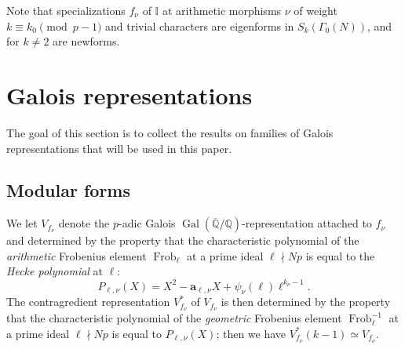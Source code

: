 \documentclass[a4paper,11pt]{amsart}
\numberwithin{equation}{section}
\theoremstyle{plain}
\theoremstyle{definition}
\theoremstyle{remark}
\newcommand{\Q}{\mathbb Q}
\newcommand{\I}{\mathbb{I}}
\DeclareMathOperator{\Frob}{Frob}
\DeclareMathOperator{\Gal}{Gal}
\begin{document}
Note that specializations $f_\nu$ of $\I$ at arithmetic morphisms $\nu$ of weight $k\equiv k_0\pmod{p-1}$ and trivial characters are eigenforms in $S_k(\Gamma_0(N))$, and for $k\neq 2$ are newforms. 


\section{Galois representations} 
The goal of this section is to collect the results on families of Galois representations that will be used in this paper. 

\subsection{Modular forms}
We let $V_{{f}_{\nu}}$ denote the $p$-adic Galois $\Gal(\overline{\Q}/\Q)$-representation attached to ${f}_{\nu}$ and determined by the property that the characteristic polynomial of the \emph{arithmetic} Frobenius element $\Frob_\ell$ at a prime ideal $\ell\nmid Np$ is equal to 
the \emph{Hecke polynomial} at $\ell$: \[P_{\ell,\nu}(X)=X^2-\mathbf{a}_{\ell,\nu} X+\psi_\nu(\ell)\ell^{k_\nu-1}.\]  
The contragredient representation $V_{{f}_{\nu}}^*$ of $V_{{f}_{\nu}}$ is then determined by the property that the characteristic polynomial of the  \emph{geometric} Frobenius element $\Frob_\ell^{-1}$ at a prime ideal $\ell\nmid Np$ is equal to $P_{\ell,\nu}(X)$; then we have 
$V_{{f}_{\nu}}^*(k-1)\simeq V_{{f}_{\nu}}$. 
\end{document}
